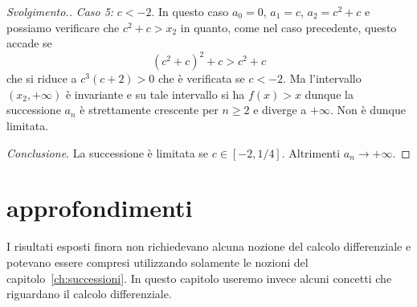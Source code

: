 \begin{proof}[Svolgimento.]
\emph{Caso 5:} $c < -2$.
In questo caso $a_0=0$, $a_1=c$, $a_2=c^2+c$ e possiamo verificare che
$c^2+c > x_2$ in quanto, come nel caso precedente, questo accade se
\[
   (c^2+c)^2 + c > c^2+c
\]
che si riduce a $c^3(c+2)>0$ che è verificata se $c<-2$.
Ma l'intervallo $(x_2,+\infty)$ è invariante e su tale intervallo
si ha $f(x)>x$ dunque la successione $a_n$ è strettamente crescente per $n\ge 2$
e diverge a $+\infty$. Non è dunque limitata.

\emph{Conclusione}. La successione è limitata se $c\in[-2,1/4]$.
Altrimenti $a_n\to +\infty$.

\end{proof}

\section{approfondimenti}

I risultati esposti finora non richiedevano
alcuna nozione del calcolo differenziale
e potevano essere compresi utilizzando solamente
le nozioni del capitolo~\ref{ch:successioni}.
In questo capitolo useremo invece
alcuni concetti che riguardano il calcolo differenziale.

